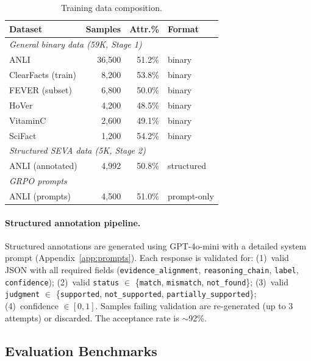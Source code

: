 \documentclass[11pt]{article}
\begin{document}
\begin{table}[h]
\centering
\small
\caption{Training data composition.}
\label{tab:train_data}
\begin{tabular}{lrrl}
\toprule
\textbf{Dataset} & \textbf{Samples} & \textbf{Attr.\%} & \textbf{Format} \\
\midrule
\multicolumn{4}{l}{\textit{General binary data (59K, Stage 1)}} \\
ANLI & 36,500 & 51.2\% & binary \\
ClearFacts (train) & 8,200 & 53.8\% & binary \\
FEVER (subset) & 6,800 & 50.0\% & binary \\
HoVer & 4,200 & 48.5\% & binary \\
VitaminC & 2,600 & 49.1\% & binary \\
SciFact & 1,200 & 54.2\% & binary \\
\midrule
\multicolumn{4}{l}{\textit{Structured SEVA data (5K, Stage 2)}} \\
ANLI (annotated) & 4,992 & 50.8\% & structured \\
\midrule
\multicolumn{4}{l}{\textit{GRPO prompts}} \\
ANLI (prompts) & 4,500 & 51.0\% & prompt-only \\
\bottomrule
\end{tabular}
\end{table}

\paragraph{Structured annotation pipeline.}
Structured annotations are generated using GPT-4o-mini with a detailed system prompt (Appendix~\ref{app:prompts}).
Each response is validated for:
(1)~valid JSON with all required fields (\texttt{evidence\_alignment}, \texttt{reasoning\_chain}, \texttt{label}, \texttt{confidence});
(2)~valid \texttt{status} $\in$ \{\texttt{match}, \texttt{mismatch}, \texttt{not\_found}\};
(3)~valid \texttt{judgment} $\in$ \{\texttt{supported}, \texttt{not\_supported}, \texttt{partially\_supported}\};
(4)~confidence $\in [0, 1]$.
Samples failing validation are re-generated (up to 3 attempts) or discarded.
The acceptance rate is $\sim$92\%.


\subsection{Evaluation Benchmarks}
\end{document}

